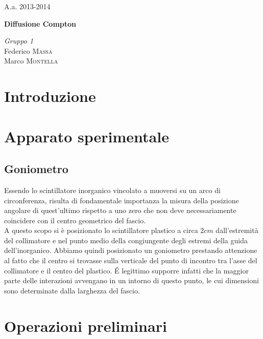 \documentclass[11pt]{article}
\begin{document}
\justify
\printindex
\Large{A.a. 2013-2014}
\vspace{10cm}
\begin{center}
\Huge\textbf{Diffusione Compton}
\end{center}

\vspace{2cm}
\begin{flushleft}
\textit{Gruppo \textsc{1}} \\
\medskip
Federico \textsc{Massa} \\ 
Marco \textsc{Montella}
\end{flushleft}



\newpage

\begin{abstract}
\justify
 

\end{abstract}
\bigskip

\section{Introduzione}



\section{Apparato sperimentale} \label{sec:apparato}
\subsection{Goniometro}
Essendo lo scintillatore inorganico vincolato a muoversi su un arco di circonferenza, risulta di fondamentale importanza la misura della posizione angolare di quest'ultimo rispetto a uno zero che non deve necessariamente coincidere con il centro geometrico del fascio. \\
A questo scopo si è posizionato lo scintillatore plastico a circa $2 cm$ dall'estremità del collimatore e nel punto medio della congiungente degli estremi della guida dell'inorganico. Abbiamo quindi posizionato un goniometro prestando attenzione al fatto che il centro si trovasse sulla verticale del punto di incontro tra l'asse del collimatore e il centro del plastico. \'E legittimo supporre infatti che la maggior parte delle interazioni avvengano in un intorno di questo punto, le cui dimensioni sono determinate dalla larghezza del fascio. \\

\section{Operazioni preliminari}
\end{document}
